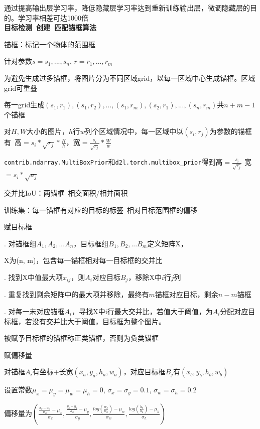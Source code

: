 \documentclass[UTF8]{ctexart}
\begin{document}
  \quad \quad 通过提高输出层学习率，降低隐藏层学习率达到重新训练输出层，微调隐藏层的目的。学习率相差可达1000倍\\
\textbf{目标检测\ 创建\ 匹配锚框算法}

  锚框：标记一个物体的范围框

  \quad 针对参数$s = {s_1, ..., s_n}$, $r = {r_1, ..., r_m}$

  \quad 为避免生成过多锚框，将图片分为不同区域grid，以每一区域中心生成锚框。区域grid可重叠

  \quad 每一grid生成$(s_1, r_1), (s_1, r_2), ..., (s_1, r_m), (s_2, r_1), ..., (s_n, r_m)$共$n+m-1$个锚框

  \quad 对$H, W$大小的图片，$h$行$w$列个区域情况中，每一区域中以$(s_i, r_j)$为参数的锚框有\ 高$ = s_i*\sqrt{r_j} * \frac{H}{h}$，宽$ = \frac{s_i}{\sqrt{r_j}} * \frac{W}{w}$

  \quad \quad \texttt{contrib.ndarray.MultiBoxPrior}和\texttt{d2l.torch.multibox\_prior}得到高$=\frac{s_i}{\sqrt{r_j}}$ 宽$ = s_i*\sqrt{a_j}$

  交并比IoU：两锚框\ 相交面积/相并面积

  训练集：每一锚框有对应的目标的标签\ 相对目标范围框的偏移

  \quad 赋目标框

  \quad {}. 对锚框组$A_1, A_2, ...A_n$，目标框组$B_1, B_2, ...B_m$定义矩阵X，

  \quad \quad \quad X为(n, m)，包含每一锚框相对每一目标框的交并比

  \quad {}. 找到X中值最大项$x_{ij}$，则$A_i$对应目标$B_j$，移除X中$i$行$j$列

  \quad {}. 重复找到剩余矩阵中的最大项并移除，最终有$m$锚框对应目标，剩余$n-m$锚框

  \quad {}. 对每一未对应锚框$A_i$，寻找X中i行最大交并比，若值大于阈值，为$A_i$分配对应目标框，若没有交并比大于阈值，目标框为整个图片。

  \quad \quad 被赋予目标框的锚框称正类锚框，否则为负类锚框

  \quad 赋偏移量

  \quad \quad 对锚框$A_i$有坐标+长宽$(x_a, y_a, h_a, w_a)$，对应目标框$B_j$有$(x_b, y_b, h_b, w_b)$

  \quad \quad 设置常数$\mu_x = \mu_y = \mu_w = \mu_h = 0$, $\sigma_x = \sigma_y = 0.1$, $\sigma_w = \sigma_h = 0.2$

  \quad \quad 偏移量为$(\frac{\frac{x_b - x_a}{w_a} - \mu_x}{\sigma_x},\frac{\frac{y_b - y_a}{h_a} - \mu_y}{\sigma_y}, \frac{log(\frac{w_b}{w_a}) - \mu_w}{\sigma_w}, \frac{log(\frac{h_b}{h_a}) - \mu_h}{\sigma_h})$
\end{document}
